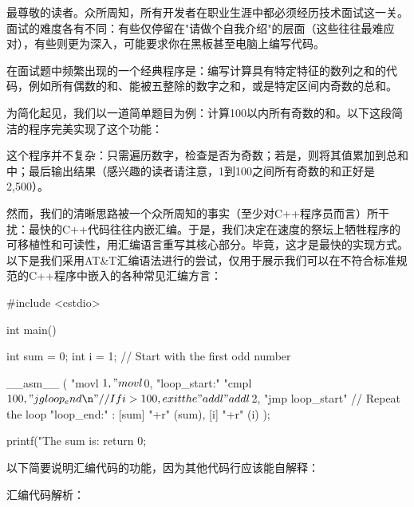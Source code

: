 
最尊敬的读者。众所周知，所有开发者在职业生涯中都必须经历技术面试这一关。面试的难度各有不同：有些仅停留在"请做个自我介绍"的层面（这些往往最难应对），有些则更为深入，可能要求你在黑板甚至电脑上编写代码。

在面试题中频繁出现的一个经典程序是：编写计算具有特定特征的数列之和的代码，例如所有偶数的和、能被五整除的数字之和，或是特定区间内奇数的总和。

为简化起见，我们以一道简单题目为例：计算100以内所有奇数的和。以下这段简洁的程序完美实现了这个功能：


这个程序并不复杂：只需遍历数字，检查是否为奇数；若是，则将其值累加到总和中；最后输出结果（感兴趣的读者请注意，1到100之间所有奇数的和正好是2,500）。

然而，我们的清晰思路被一个众所周知的事实（至少对C++程序员而言）所干扰：最快的C++代码往往内嵌汇编。于是，我们决定在速度的祭坛上牺牲程序的可移植性和可读性，用汇编语言重写其核心部分。毕竟，这才是最快的实现方式。以下是我们采用AT\&T汇编语法进行的尝试，仅用于展示我们可以在不符合标准规范的C++程序中嵌入的各种常见汇编方言：

\begin{cpp}
#include <cstdio>

int main() {
  int sum = 0;
  int i = 1; // Start with the first odd number
         
  __asm__ (
    "movl $1, %
    "movl $0, %
    "loop_start:\n"
    "cmpl $100, %
    "jg loop_end\n" // If i > 100, exit the
    "addl %
    "addl $2, %
    "jmp loop_start\n" // Repeat the loop
    "loop_end:\n"
    : [sum] "+r" (sum), [i] "+r" (i)
  );

  printf("The sum is: %
  return 0;
}
\end{cpp}

以下简要说明汇编代码的功能，因为其他代码行应该能自解释：

汇编代码解析：

